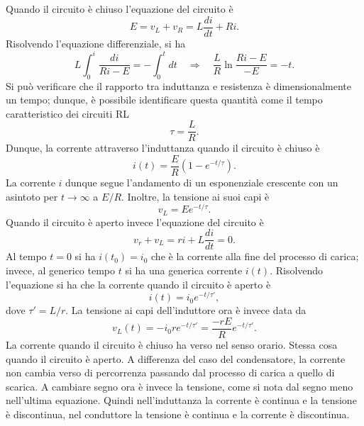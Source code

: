 Quando il circuito è chiuso l'equazione del circuito è
\begin{equation}
    E=v_L+v_R=L\frac{di}{dt}+Ri.
\end{equation}
Risolvendo l'equazione differenziale, si ha
\begin{equation}
    L\int_{0}^{i}\frac{di}{Ri-E}=-\int_{0}^{t}dt\quad\Rightarrow\quad\frac{L}{R}\ln{\frac{Ri-E}{-E}}=-t.
\end{equation}
Si può verificare che il rapporto tra induttanza e resistenza è dimensionalmente un tempo; dunque, è possibile identificare questa quantità come il tempo caratteristico dei circuiti RL
\begin{equation}
    \tau=\frac{L}{R}.
\end{equation}
Dunque, la corrente attraverso l'induttanza quando il circuito è chiuso è
\begin{equation}
    i(t)=\frac{E}{R}\left(1-e^{-t/\tau}\right).
\end{equation}
La corrente $i$ dunque segue l'andamento di un esponenziale crescente con un asintoto per $t\to\infty$ a $E/R$. Inoltre, la tensione ai suoi capi è
\begin{equation}
    v_L=Ee^{-t/\tau}.
\end{equation}
Quando il circuito è aperto invece l'equazione del circuito è
\begin{equation}
    v_r+v_L=ri+L\frac{di}{dt}=0.
\end{equation}
Al tempo $t=0$ si ha $i(t_0)=i_0$ che è la corrente alla fine del processo di carica; invece, al generico tempo $t$ si ha una generica corrente $i(t)$. Risolvendo l'equazione si ha che la corrente quando il circuito è aperto è 
\begin{equation}
    i(t)=i_0e^{-t/\tau'},
\end{equation}
dove $\tau'=L/r$. La tensione ai capi dell'induttore ora è invece data da
\begin{equation}
    v_L(t)=-i_0re^{-t/\tau'}=\frac{-rE}{R}e^{-t/\tau'}.
\end{equation}
La corrente quando il circuito è chiuso ha verso nel senso orario. Stessa cosa quando il circuito è aperto. A differenza del caso del condensatore, la corrente non cambia verso di percorrenza passando dal processo di carica a quello di scarica. A cambiare segno ora è invece la tensione, come si nota dal segno meno nell'ultima equazione. Quindi nell'induttanza la corrente è continua e la tensione è discontinua, nel conduttore la tensione è continua e la corrente è discontinua.

